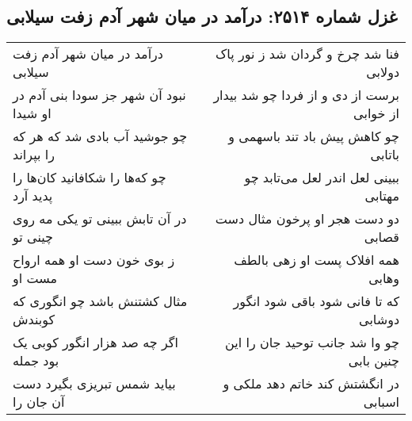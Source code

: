 \begin{center}
\section*{غزل شماره ۲۵۱۴: درآمد در میان شهر آدم زفت سیلابی}
\label{sec:2514}
\begin{longtable}{l p{0.5cm} r}
درآمد در میان شهر آدم زفت سیلابی
&&
فنا شد چرخ و گردان شد ز نور پاک دولابی
\\
نبود آن شهر جز سودا بنی آدم در او شیدا
&&
برست از دی و از فردا چو شد بیدار از خوابی
\\
چو جوشید آب بادی شد که هر که را بپراند
&&
چو کاهش پیش باد تند باسهمی و باتابی
\\
چو که‌ها را شکافانید کان‌ها را پدید آرد
&&
ببینی لعل اندر لعل می‌تابد چو مهتابی
\\
در آن تابش ببینی تو یکی مه روی چینی تو
&&
دو دست هجر او پرخون مثال دست قصابی
\\
ز بوی خون دست او همه ارواح مست او
&&
همه افلاک پست او زهی بالطف وهابی
\\
مثال کشتنش باشد چو انگوری که کوبندش
&&
که تا فانی شود باقی شود انگور دوشابی
\\
اگر چه صد هزار انگور کوبی یک بود جمله
&&
چو وا شد جانب توحید جان را این چنین بابی
\\
بیاید شمس تبریزی بگیرد دست آن جان را
&&
در انگشتش کند خاتم دهد ملکی و اسبابی
\\
\end{longtable}
\end{center}
